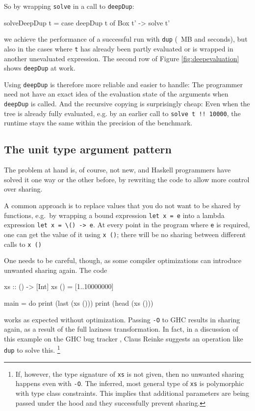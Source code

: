 \documentclass[preprint]{sigplanconf}
\theoremstyle{nonumberplain}
\newcommand{\li}{\lstinline[style=Haskell]}
\newcommand{\ci}{\lstinline[style=Cmm]}
\begin{document}
So by wrapping \li-solve- in a call to \li-deepDup-:
\begin{haskell}
solveDeepDup t = case deepDup t of Box t' -> solve t'
\end{haskell}
we achieve the performance of a successful run with \li-dup- (~MB and  seconds), but also in the cases where \li-t- has already been partly evaluated or is wrapped in another unevaluated expression. The second row of Figure \ref{fig:deepevaluation} shows \li-deepDup- at work.

Using \li-deepDup- is therefore more reliable and easier to handle: The programmer need not have an exact idea of the evaluation state of the arguments when \li-deepDup- is called. And the recursive copying is surprisingly cheap: Even when the tree is already fully evaluated, e.g. by an earlier call to \li-solve t !! 10000-, the runtime stays the same within the precision of the benchmark.


\subsection{The unit type argument pattern}

The problem at hand is, of course, not new, and Haskell programmers have solved it one way or the other before, by rewriting the code to allow more control over sharing.

\label{sec:unit}

A common approach is to replace values that you do not want to be shared by functions, e.g.\ by wrapping a bound expression \li-let x = e- into a lambda expression \li!let x = \() -> e!. At every point in the program where \li-e- is required, one can get the value of it using \li-x ()-; there will be no sharing between different calls to \li-x ()-

One needs to be careful, though, as some compiler optimizations can introduce unwanted sharing again. The code
\begin{haskell}
xs :: () -> [Int]
xs () = [1..10000000]

main = do
    print (last (xs ()))
    print (head (xs ()))
\end{haskell}
works as expected without optimization. Passing  \ci!-O! to GHC results in sharing again, as a result of the full laziness transformation. In fact, in a discussion of this example on the GHC bug tracker \citep{spaceleakbug}, Claus Reinke suggests an operation like \li-dup- to solve this.%
\footnote{
If, however, the type signature of \li-xs- is not given, then no unwanted sharing happens even with \ci!-O!. The inferred, most general type of \li-xs- is polymorphic with type class constraints. This implies that additional parameters are being passed under the hood and they successfully prevent sharing.
}
\end{document}
